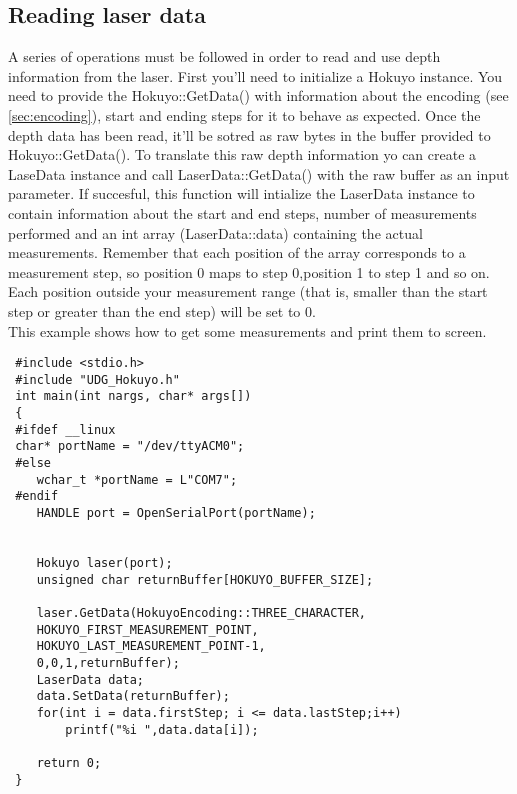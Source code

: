\documentclass{book}
\begin{document}
\subsection{Reading laser data}
A series of operations must be followed in order to read and use depth information from the laser. First you'll need to initialize a Hokuyo instance. You need to provide the Hokuyo::GetData() with information about the encoding (see \ref{sec:encoding}), start and ending steps for it to behave as expected. Once the depth data has been read, it'll be sotred as raw bytes in the buffer provided to Hokuyo::GetData(). To translate this raw depth information  yo can create a LaseData instance and call LaserData::GetData() with the raw buffer as an input parameter. If succesful, this function will intialize the LaserData instance to contain information about the start and end steps, number of measurements performed and an int array (LaserData::data) containing the actual measurements. Remember that each position of the array corresponds to a measurement step, so position 0 maps to step 0,position 1 to step 1 and so on. Each position outside your measurement range (that is, smaller than the start step or greater than the end step) will be set to 0.\\
This example shows how to get some measurements and print them to screen.\\
 \begin{lstlisting}
 #include <stdio.h>
 #include "UDG_Hokuyo.h"
 int main(int nargs, char* args[])
 {
 #ifdef __linux
 char* portName = "/dev/ttyACM0";
 #else
 	wchar_t *portName = L"COM7";
 #endif
 	HANDLE port = OpenSerialPort(portName);
 	
 	
 	Hokuyo laser(port);
 	unsigned char returnBuffer[HOKUYO_BUFFER_SIZE];
 	
 	laser.GetData(HokuyoEncoding::THREE_CHARACTER,
 	HOKUYO_FIRST_MEASUREMENT_POINT,
 	HOKUYO_LAST_MEASUREMENT_POINT-1,
 	0,0,1,returnBuffer);
 	LaserData data;
 	data.SetData(returnBuffer);
 	for(int i = data.firstStep; i <= data.lastStep;i++)
 		printf("%i ",data.data[i]);
 	
 	return 0;
 }
 	
 \end{lstlisting}
\end{document}
